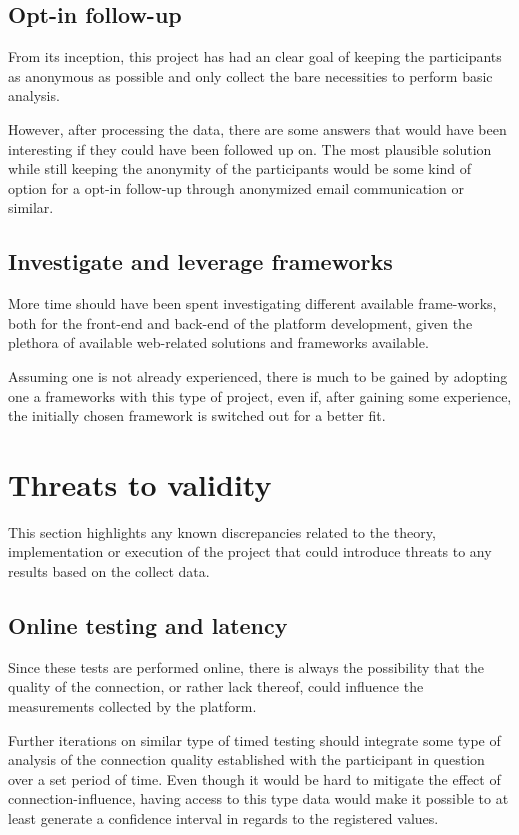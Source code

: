   \subsection{Opt-in follow-up}

  From its inception, this project has had an clear goal of keeping the
  participants as anonymous as possible and only collect the bare necessities
  to perform basic analysis.

  However, after processing the data, there are some answers that would have
  been interesting if they could have been followed up on. The most plausible
  solution while still keeping the anonymity of the participants would be some
  kind of option for a opt-in follow-up through anonymized email communication
  or similar.

  \subsection{Investigate and leverage frameworks}

  More time should have been spent investigating different available
  frame-works, both for the front-end and back-end of the platform development,
  given the plethora of available web-related solutions and frameworks available.

  Assuming one is not already experienced, there is much to be gained by
  adopting one a frameworks with this type of project, even if, after gaining
  some experience, the initially chosen framework is switched out for a better
  fit.

  \section{Threats to validity}

  This section highlights any known discrepancies related to the theory,
  implementation or execution of the project that could introduce threats to
  any results based on the collect data.

  \subsection{Online testing and latency}

  Since these tests are performed online, there is always the possibility that
  the quality of the connection, or rather lack thereof, could influence the
  measurements collected by the platform.

  Further iterations on similar type of timed testing should integrate some
  type of analysis of the connection quality established with the participant
  in question over a set period of time. Even though it would be hard to
  mitigate the effect of connection-influence, having access to this type data
  would make it possible to at least generate a confidence interval in regards
  to the registered values.

